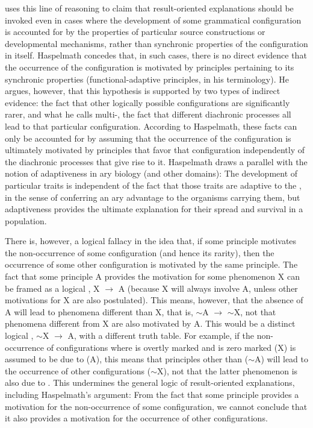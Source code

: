 \documentclass[output=paper]{langsci/langscibook}
\begin{document}
 uses this line of reasoning to claim that
result-oriented explanations should be invoked even in cases where
the development of some grammatical configuration is accounted
for by the properties of particular source constructions or developmental
mechanisms, rather than synchronic properties of the configuration in itself. Haspelmath concedes that, in such cases, there is no direct evidence that the occurrence of the
configuration is motivated by principles pertaining to its synchronic
properties (functional-adaptive principles, in his terminology). He argues, however, that this
hypothesis is supported by two types of indirect evidence: the fact
that other logically possible configurations are significantly rarer, and what he calls
multi-, the fact that different diachronic processes all
lead to that particular configuration. According to Haspelmath, these facts
can only be accounted for by assuming that the occurrence of
the configuration is ultimately motivated by
principles that favor that configuration independently of the
diachronic processes that give rise to it.
 Haspelmath draws a parallel with the notion
of adaptiveness in ary biology (and other domains):
The development of particular traits is independent of the fact that
those traits are adaptive to the , in the sense of conferring an ary advantage to the organisms
carrying them, but adaptiveness provides the ultimate explanation for their
spread and survival in a population.

There is, however, a logical fallacy in the idea that, if some
 principle motivates the  non-occurrence of some
configuration (and hence its rarity),
then the occurrence of some other configuration is motivated by the
same principle. The fact that some principle A provides the motivation
for some phenomenon X can be framed as a logical ,  X
$\rightarrow$ A (because X will always involve A, unless other
motivations for X are also postulated).  This
 means, however, that the absence of A will lead to phenomena different
than X, that is, $\sim$A $\rightarrow$ $\sim$X, not that phenomena
different from X are also motivated by A. This would be a distinct logical
, $\sim$X $\rightarrow$ A, with a different truth table.
For example, if the non-occurrence
of configurations where  is
overtly marked and  is zero marked (X) is assumed to be due to
 (A), this means that principles other than  ($\sim$A) will lead to the occurrence of other configurations ($\sim$X), not that
the latter phenomenon is also due to . This undermines the general logic of result-oriented explanations, including Haspelmath's
argument: From the fact that some principle provides 
a motivation for the non-occurrence of some
configuration, we cannot conclude that it also provides a
motivation for the occurrence of other configurations.
\end{document}

